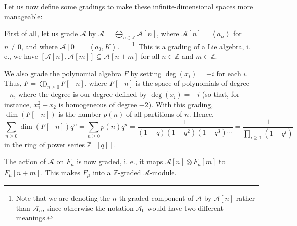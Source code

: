\documentclass
[numbers=enddot,12pt,final,onecolumn,german,notitlepage]{scrartcl}%
\theoremstyle{definition}
\begin{document}
Let us now define some gradings to make these infinite-dimensional spaces more manageable:

First of all, let us grade $\mathcal{A}$ by $\mathcal{A}=\bigoplus
\limits_{n\in\mathbb{Z}}\mathcal{A}\left[  n\right]  $, where $\mathcal{A}%
\left[  n\right]  =\left\langle a_{n}\right\rangle $ for $n\neq0$, and where
$\mathcal{A}\left[  0\right]  =\left\langle a_{0},K\right\rangle $.
\ \ \ \footnote{Note that we are denoting the $n$-th graded component of
$\mathcal{A}$ by $\mathcal{A}\left[  n\right]  $ rather than $\mathcal{A}_{n}%
$, since otherwise the notation $\mathcal{A}_{0}$ would have two different
meanings.}\ This is a grading of a Lie algebra, i. e., we have $\left[
\mathcal{A}\left[  n\right]  ,\mathcal{A}\left[  m\right]  \right]
\subseteq\mathcal{A}\left[  n+m\right]  $ for all $n\in\mathbb{Z}$ and
$m\in\mathbb{Z}$.

We also grade the polynomial algebra $F$ by setting $\deg\left(  x_{i}\right)
=-i$ for each $i$. Thus, $F=\bigoplus\limits_{n\geq0}F\left[  -n\right]  $,
where $F\left[  -n\right]  $ is the space of polynomials of degree $-n$, where
the degree is our degree defined by $\deg\left(  x_{i}\right)  =-i$ (so that,
for instance, $x_{1}^{2}+x_{2}$ is homogeneous of degree $-2$). With this
grading, $\dim\left(  F\left[  -n\right]  \right)  $ is the number $p\left(
n\right)  $ of all partitions of $n$. Hence,%
\[
\sum\limits_{n\geq0}\dim\left(  F\left[  -n\right]  \right)  q^{n}%
=\sum\limits_{n\geq0}p\left(  n\right)  q^{n}=\dfrac{1}{\left(  1-q\right)
\left(  1-q^{2}\right)  \left(  1-q^{3}\right)  \cdots}=\dfrac{1}%
{\prod\limits_{i\geq1}\left(  1-q^{i}\right)  }%
\]
in the ring of power series $\mathbb{Z}\left[  \left[  q\right]  \right]  $.

The action of $\mathcal{A}$ on $F_{\mu}$ is now graded, i. e., it maps
$\mathcal{A}\left[  n\right]  \otimes F_{\mu}\left[  m\right]  $ to $F_{\mu
}\left[  n+m\right]  $. This makes $F_{\mu}$ into a $\mathbb{Z}$-graded
$\mathcal{A}$-module.
\end{document}
